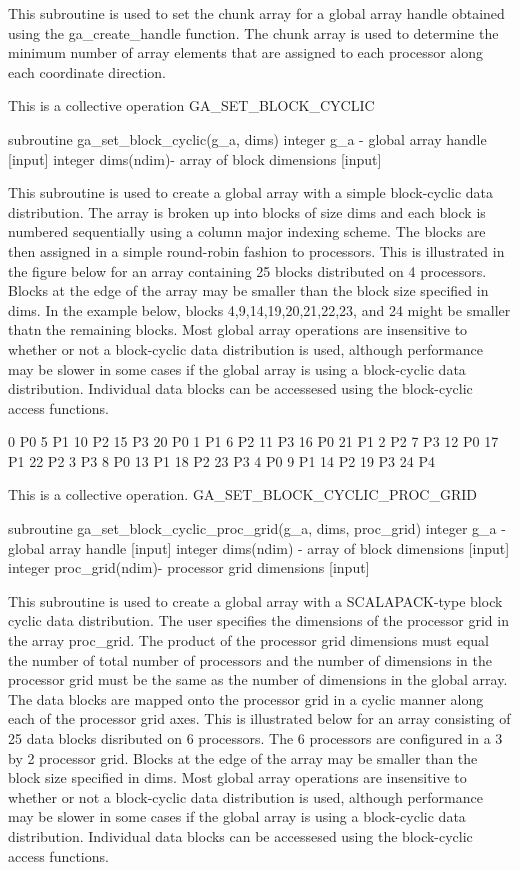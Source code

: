 This subroutine is used to set the chunk array for a global array
handle obtained using the ga\_create\_handle function. The chunk array
is used to determine the minimum number of array elements that are
assigned to each processor along each coordinate direction.

This is a collective operation GA\_SET\_BLOCK\_CYCLIC

subroutine ga\_set\_block\_cyclic(g\_a, dims) integer g\_a - global
array handle {[}input{]} integer dims(ndim)- array of block dimensions
{[}input{]}

This subroutine is used to create a global array with a simple block-cyclic
data distribution. The array is broken up into blocks of size dims
and each block is numbered sequentially using a column major indexing
scheme. The blocks are then assigned in a simple round-robin fashion
to processors. This is illustrated in the figure below for an array
containing 25 blocks distributed on 4 processors. Blocks at the edge
of the array may be smaller than the block size specified in dims.
In the example below, blocks 4,9,14,19,20,21,22,23, and 24 might be
smaller thatn the remaining blocks. Most global array operations are
insensitive to whether or not a block-cyclic data distribution is
used, although performance may be slower in some cases if the global
array is using a block-cyclic data distribution. Individual data blocks
can be accessesed using the block-cyclic access functions.

0 P0 5 P1 10 P2 15 P3 20 P0 1 P1 6 P2 11 P3 16 P0 21 P1 2 P2 7 P3
12 P0 17 P1 22 P2 3 P3 8 P0 13 P1 18 P2 23 P3 4 P0 9 P1 14 P2 19 P3
24 P4

This is a collective operation. GA\_SET\_BLOCK\_CYCLIC\_PROC\_GRID

subroutine ga\_set\_block\_cyclic\_proc\_grid(g\_a, dims, proc\_grid)
integer g\_a - global array handle {[}input{]} integer dims(ndim)
- array of block dimensions {[}input{]} integer proc\_grid(ndim)-
processor grid dimensions {[}input{]}

This subroutine is used to create a global array with a SCALAPACK-type
block cyclic data distribution. The user specifies the dimensions
of the processor grid in the array proc\_grid. The product of the
processor grid dimensions must equal the number of total number of
processors and the number of dimensions in the processor grid must
be the same as the number of dimensions in the global array. The data
blocks are mapped onto the processor grid in a cyclic manner along
each of the processor grid axes. This is illustrated below for an
array consisting of 25 data blocks disributed on 6 processors. The
6 processors are configured in a 3 by 2 processor grid. Blocks at
the edge of the array may be smaller than the block size specified
in dims. Most global array operations are insensitive to whether or
not a block-cyclic data distribution is used, although performance
may be slower in some cases if the global array is using a block-cyclic
data distribution. Individual data blocks can be accessesed using
the block-cyclic access functions.

